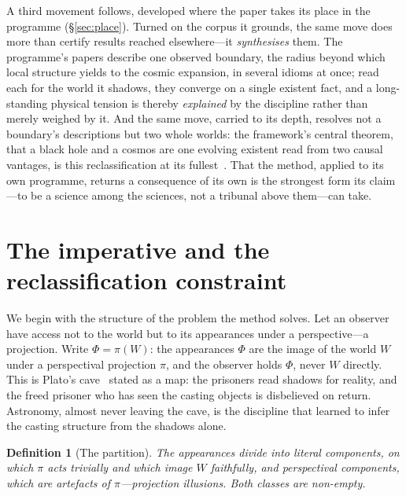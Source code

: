\documentclass[11pt,a4paper]{article}
\newtheorem{definition}{Definition}
\begin{document}
A third movement follows, developed where the paper takes its place in the programme (\S\ref{sec:place}). Turned on the corpus it grounds, the same move does more than certify results reached elsewhere---it \emph{synthesises} them. The programme's papers describe one observed boundary, the radius beyond which local structure yields to the cosmic expansion, in several idioms at once; read each for the world it shadows, they converge on a single existent fact, and a long-standing physical tension is thereby \emph{explained} by the discipline rather than merely weighed by it. And the same move, carried to its depth, resolves not a boundary's descriptions but two whole worlds: the framework's central theorem, that a black hole and a cosmos are one evolving existent read from two causal vantages, is this reclassification at its fullest~\cite{JanzenCRframework}. That the method, applied to its own programme, returns a consequence of its own is the strongest form its claim---to be a science among the sciences, not a tribunal above them---can take.

\section{The imperative and the reclassification constraint}\label{sec:imperative}

We begin with the structure of the problem the method solves. Let an observer have access not to the world but to its appearances under a perspective---a projection. Write $\Phi=\pi(W)$: the appearances $\Phi$ are the image of the world $W$ under a perspectival projection $\pi$, and the observer holds $\Phi$, never $W$ directly. This is Plato's cave~\cite{PlatoRepublic} stated as a map: the prisoners read shadows for reality, and the freed prisoner who has seen the casting objects is disbelieved on return. Astronomy, almost never leaving the cave, is the discipline that learned to infer the casting structure from the shadows alone.

\begin{definition}[The partition]\label{def:partition}
The appearances divide into \emph{literal} components, on which $\pi$ acts trivially and which image $W$ faithfully, and \emph{perspectival} components, which are artefacts of $\pi$---projection illusions. Both classes are non-empty.
\end{definition}
\end{document}
